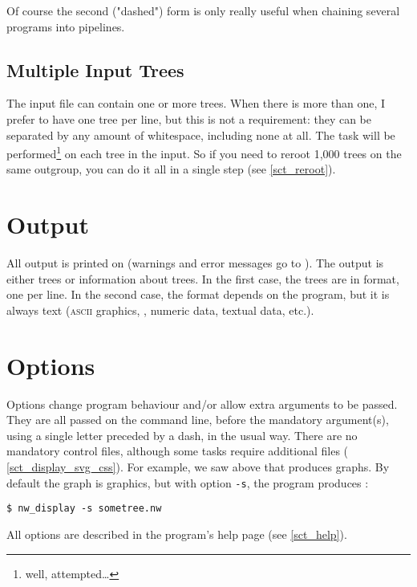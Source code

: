 \noindent{}Of course the second ("dashed") form is only really useful when chaining several programs into pipelines.

\subsection{Multiple Input Trees}

The input file can contain one or more trees. When there is more than one, I
prefer to have one tree per line, but this is not a requirement: they can be
separated by any amount of whitespace, including none at all. The task will be
performed\footnote{well, attempted\ldots} on each tree in the input. So if you
need to reroot 1,000 trees on the same outgroup, you can do it all in a single
step (see \ref{sct_reroot}). 

\section{Output}
\label{sct_output}

All output is printed on \stdout{} (warnings and error messages go to \stderr).
The output is either trees or information about trees. In the first case,
the trees are in \nw{} format, one per line. In the second case, the format
depends on the program, but it is always text (\textsc{ascii} graphics, \svg,
numeric data, textual data, etc.).

\section{Options}
\label{sct_options}

Options change program behaviour and/or allow extra arguments to be passed.
They are all passed on the command line, before the mandatory argument(s),
using a single letter preceded by a dash, in the usual \unix{} way. There are
no mandatory control files, although some tasks require additional files (\eg{}
\ref{sct_display_svg_css}). For example, we saw above that \display{} produces
graphs. By default the graph is \ascii{} graphics, but with option \texttt{-s},
the program produces \svg:
\begin{verbatim}
$ nw_display -s sometree.nw
\end{verbatim}
All options are described in the program's help page (see \ref{sct_help}).
